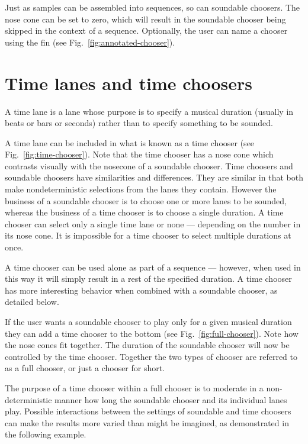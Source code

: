 \documentclass[runningheads,a4paper]{llncs}
\begin{document}
Just as samples can be assembled into sequences, so can soundable choosers. The nose cone can be set to zero, which will result in the soundable chooser being skipped in the context of a sequence. Optionally, the user can name a chooser using the fin (see Fig.~\ref{fig:annotated-chooser}).



\section{Time lanes and time choosers}\label{time-lanes-and-time-choosers}

A time lane is a lane whose purpose is to specify a musical duration (usually in beats or bars or seconds) rather than to specify something to be sounded. 
 
A time lane can be included in what is known as a time chooser (see Fig.~\ref{fig:time-chooser}). Note that the time chooser has a nose cone which contrasts visually with the nosecone of a soundable chooser. Time choosers and soundable choosers have similarities and differences. They are similar in that both make nondeterministic selections from the lanes they contain. However the business of a soundable chooser is to choose one or more lanes to be sounded, whereas the business of a time chooser is to choose a single duration. A time chooser can select only a single time lane or none --- depending on the number in its nose cone. It is impossible for a time chooser to select multiple durations at once.
 
A time chooser can be used alone as part of a sequence --- however, when used in this way it will simply result in a rest of the specified duration. A time chooser has more interesting behavior when combined with a soundable chooser, as detailed below.

If the user wants a soundable chooser to play only for a given musical duration they can add a time chooser to the bottom (see Fig.~\ref{fig:full-chooser}). Note how the nose cones fit together. The duration of the soundable chooser will now be controlled by the time chooser. Together the two types of chooser are referred to as a full chooser, or just a chooser for short. 
 
The purpose of a time chooser within a full chooser is to moderate in a non-deterministic manner how long the soundable chooser and its individual lanes play. Possible interactions between the settings of soundable and time choosers can make the results more varied than might be imagined, as demonstrated in the following example.
\end{document}
